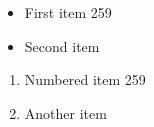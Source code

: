\documentclass{article}
\begin{document}
\begin{itemize}
\item First item 259
\item Second item
\end{itemize}
\begin{enumerate}
\item Numbered item 259
\item Another item
\end{enumerate}
\end{document}
